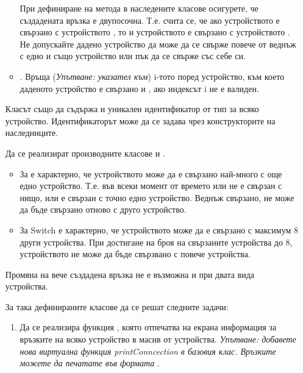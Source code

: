 \begin{enumerate}[resume]
\begin{itemize}
		При дефиниране на метода в наследените класове осигурете, че създадената връзка е двупосочна. Т.е. счита се, че ако устройството  е свързано с устройството , то и устройството  е свързано с устройството . Не допускайте дадено устройство да може да се свърже повече от веднъж с едно и също устройство или пък да се свърже със себе си.

		\item {}. Връща (\textit{Упътване: указател към}) i-тото поред устройство, към което даденото устройство е свързано и , ако индексът i не е валиден.

	\end{itemize}

	Класът  също да съдържа и уникален идентификатор от тип  за всяко устройство. Идентификаторът може да се задава чрез конструкторите на наследниците.

	Да се реализират производните класове  и .

	\begin{itemize}
		\item За  е характерно, че устройството може да е свързано най-много с още едно устройство. Т.е. във всеки момент от времето  или не е свързан с нищо, или е свързан с точно едно устройство. Веднъж свързано,  не може да бъде свързано отново с друго устройство.

		\item За Switch е характерно, че устройството може да е свързано с максимум 8 други устройства. При достигане на броя на свързаните устройства до 8, устройството  не може да бъде свързвано с повече устройства.

	\end{itemize}

	Промяна на вече създадена връзка не е възможна и при двата вида устройства.

	За така дефинираните класове да се решат следните задачи:


	\begin{enumerate}[label=\alph*)]
		\item Да се реализира функция , която отпечатва на екрана информация за връзките на всяко устройство в масив от устройства. \textit{Упътване: добавете нова виртуална функция printConncection в базовия клас. Връзките можете да печатате във формата }.


\end{enumerate}
\end{enumerate}
